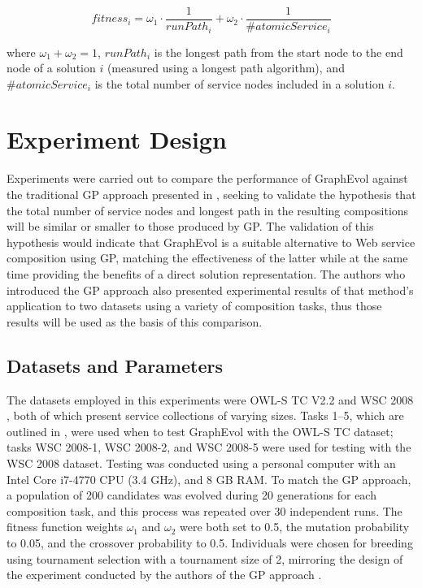 \documentclass{article}
\begin{document}
\begin{equation}
 fitness_i = \omega_1 \cdot \frac{1}{runPath_i} + \omega_2 \cdot \frac{1}{\#atomicService_i}
\end{equation}

\noindent where $ \omega_1 + \omega_2 = 1$, $runPath_i$ is the longest path from the start node to the end node of a solution $i$ (measured using a longest
path algorithm), and $\#atomicService_i$ is the total number of service nodes included in a solution $i$.

\section{Experiment Design}\label{experimentdesign}
Experiments were carried out to compare the performance of GraphEvol against the traditional GP approach presented in \cite{rodriguez2010composition}, seeking to validate
the hypothesis that the total number of service nodes and longest path in the resulting compositions will be similar or smaller to those produced
by GP. The validation of this hypothesis would indicate that GraphEvol is a suitable alternative to Web service composition using GP, matching the effectiveness of the
latter while at the same time providing the benefits of a direct solution representation. The authors who introduced the GP approach also presented experimental
results of that method's application to two datasets using a variety of composition tasks, thus those results will be used as the basis of this comparison.

\subsection{Datasets and Parameters}
The datasets employed in this experiments were OWL-S TC V2.2 \cite{kuster2008opossum} and WSC 2008 \cite{bansal2008wsc}, both of which present service collections
of varying sizes. Tasks 1--5, which are outlined in \cite{rodriguez2010composition},
were used when to test GraphEvol with the OWL-S TC dataset; tasks WSC 2008-1, WSC 2008-2, and WSC 2008-5 were used for testing with the WSC 2008 dataset.
Testing was conducted using a personal computer with an Intel Core i7-4770 CPU (3.4 GHz), and 8 GB RAM. To match the GP approach, a population of 200 candidates was
evolved during 20 generations for each composition task, and this process was repeated over 30 independent runs. The fitness function weights $\omega_1$ and $\omega_2$
were both set to 0.5, the mutation probability to 0.05, and the crossover probability to 0.5. Individuals were chosen for breeding using tournament selection with a 
tournament size of 2, mirroring the design of the experiment conducted by the authors of the GP approach \cite{rodriguez2010composition}.
\end{document}
